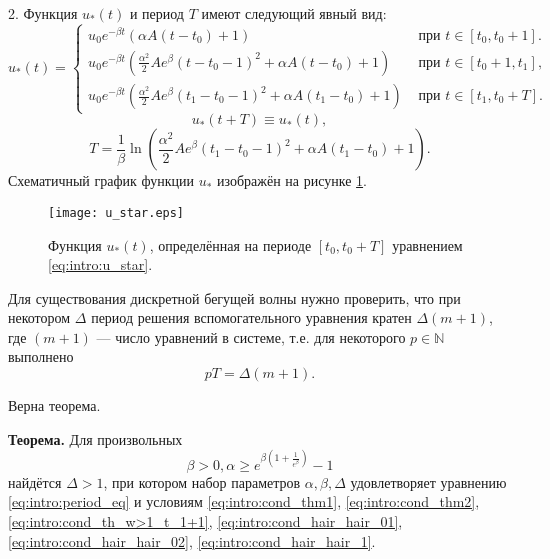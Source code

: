 2. Функция $u_*(t)$ и период $T$ имеют следующий явный вид: 
%
\small
\begin{equation}
	\label{eq:intro:u_star}
	u_*(t)=
	\begin{cases}
		u_0 e^{-\beta t}(\alpha A(t-t_0)+1) & \text{ при } t\in[t_0,t_0+1].
		\\
		u_0 e^{-\beta t}\left(\frac{\alpha^2}{2}Ae^{\beta}(t-t_0-1)^2+\alpha A(t-t_0)+1\right) & \text{ при } t\in[t_0+1,t_1],
		\\
		u_0 e^{-\beta t}\left(\frac{\alpha^2}{2}Ae^{\beta}(t_1-t_0-1)^2+\alpha A(t_1-t_0)+1\right) & \text{ при } t\in[t_1,t_0+T].
	\end{cases}
\end{equation}
\normalsize
%
\[
u_*(t + T) \equiv u_*(t),
\]
%
\begin{equation}
	\label{eq:intro:mg_period_T}
	T = \dfrac{1}{\beta}\ln\left( \frac{\alpha^2}{2}Ae^{\beta}(t_1-t_0-1)^2+\alpha A(t_1-t_0)+1\right). 
\end{equation}
%
Схематичный график функции $u_*$ изображён на рисунке \ref{fig:intro:u_star}.
%
\begin{figure}[h]
	\centering
	\texttt{[image: u\_star.eps]}
	\caption{Функция $u_*(t)$, определённая на периоде $[t_0, t_0 + T]$ уравнением \eqref{eq:intro:u_star}.}
	\label{fig:intro:u_star}
\end{figure}

Для существования дискретной бегущей волны нужно проверить, что при некотором $\Delta$ период решения вспомогательного уравнения кратен $\Delta (m + 1)$, где $(m + 1)$ --- число уравнений в системе, т.е. для некоторого $p \in \mathbb{N}$ выполнено
\begin{equation}
	\label{eq:intro:period_eq}
	pT = \Delta (m + 1).
\end{equation}

Верна теорема.

\textbf{Теорема.} Для произвольных 
%
\begin{equation}
	\label{eq:intro:constraints_parameters_final}
	\beta > 0, \alpha \geq e^{\beta\left(1 + \frac{1}{e^{\beta}}\right)} - 1
\end{equation}
%
найдётся $\Delta > 1$, при котором набор параметров $\alpha, \beta, \Delta$ удовлетворяет уравнению \eqref{eq:intro:period_eq} и условиям \eqref{eq:intro:cond_thm1}, \eqref{eq:intro:cond_thm2}, \eqref{eq:intro:cond_th_w>1_t_1+1}, \eqref{eq:intro:cond_hair_hair_01}, \eqref{eq:intro:cond_hair_hair_02}, \eqref{eq:intro:cond_hair_hair_1}.

